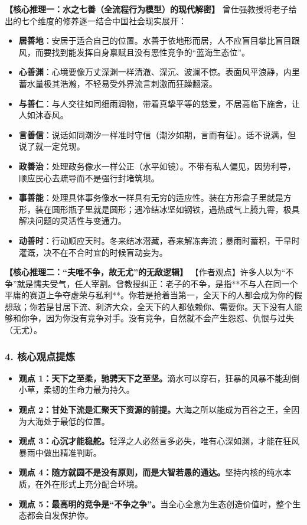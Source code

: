 \noindent\textbf{【核心推理一：水之七善（全流程行为模型）的现代解密】}
曾仕强教授将老子给出的七个维度的修养逐一结合中国社会现实展开：
\begin{itemize}
    \item \textbf{居善地}：安居于适合自己的位置。水善于依地形而居，人不应盲目攀比盲目跟风，而要找到能发挥自身禀赋且没有恶性竞争的“蓝海生态位”。
    \item \textbf{心善渊}：心境要像万丈深渊一样清澈、深沉、波澜不惊。表面风平浪静，内里蓄水量极其浩瀚，不轻易受外界流言刺激而狂躁翻滚。
    \item \textbf{与善仁}：与人交往如同细雨润物，带着真挚平等的慈爱，不居高临下施舍，让人如沐春风。
    \item \textbf{言善信}：说话如同潮汐一样准时守信（潮汐如期，言而有征）。话不说满，但说了就一定兑现。
    \item \textbf{政善治}：处理政务像水一样公正（水平如镜）。不带有私人偏见，因势利导，顺应民心去疏导而不是强行封堵筑坝。
    \item \textbf{事善能}：处理具体事务像水一样具有无穷的适应性。装在方形盒子里就是方形，装在圆形瓶子里就是圆形；遇冷结冰坚如钢铁，遇热成气上腾九霄，极具解决问题的灵活性与变通力。
    \item \textbf{动善时}：行动顺应天时。冬来结冰潜藏，春来解冻奔流；暴雨时蓄积，干旱时灌溉，决不在不合时宜的时候盲动妄为。
\end{itemize}

\noindent\textbf{【核心推理二：“夫唯不争，故无尤”的无敌逻辑】}
【作者观点】许多人以为“不争”就是懦夫受气，任人宰割。曾教授纠正：老子的不争，是指**不与人在同一个平庸的赛道上争夺虚荣与私利**。你若是抢着当第一，全天下的人都会成为你的假想敌；你若是甘居下流、利济大众，全天下的人都依赖你、需要你。天下没有人能够和你争，因为你没有竞争对手。没有竞争，自然就不会产生怨怼、仇恨与过失（无尤）。

\subsubsection{4. 核心观点提炼}
\begin{itemize}
    \item \textbf{观点 1：天下之至柔，驰骋天下之至坚。}滴水可以穿石，狂暴的风暴不能刮倒小草，柔韧的生命力最为持久。
    \item \textbf{观点 2：甘处下流是汇聚天下资源的前提。}大海之所以能成为百谷之王，全因为大海处于最低的位置。
    \item \textbf{观点 3：心沉才能稳舵。}轻浮之人必然言多必失，唯有心深如渊，才能在狂风暴雨中做出精准判断。
    \item \textbf{观点 4：随方就圆不是没有原则，而是大智若愚的通达。}坚持内核的纯水本质，在外在形式上充分配合环境。
    \item \textbf{观点 5：最高明的竞争是“不争之争”。}当全心全意为生态创造价值时，整个生态都会自发保护你。
\end{itemize}

